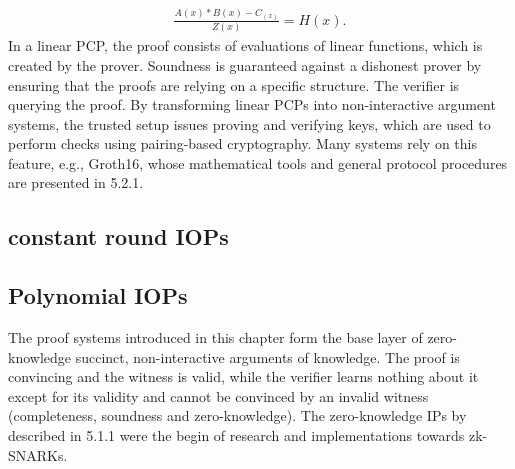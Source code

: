 \begin{align}
    \frac{A(x) * B(x) - C_(x)}{Z(x)} = H(x).
\end{align}
In a linear PCP, the proof consists of evaluations of linear functions, which is created by the prover. Soundness is guaranteed against a dishonest prover by ensuring that the proofs are relying on a specific structure. The verifier is querying the proof. By transforming linear PCPs into non-interactive argument systems, the trusted setup issues proving and verifying keys, which are used to perform checks using pairing-based cryptography. Many systems rely on this feature, e.g., Groth16, whose mathematical tools and general protocol procedures are presented in 5.2.1.

\subsection{constant round IOPs}
\subsection{Polynomial IOPs}

The proof systems introduced in this chapter form the base layer of zero-knowledge succinct, non-interactive arguments of knowledge. The proof is convincing and the witness is valid, while the verifier learns nothing about it except for its validity and cannot be convinced by an invalid witness (completeness, soundness and zero-knowledge). The zero-knowledge IPs by \citet{GoldwasserIPs} described in 5.1.1 were the begin of research and implementations towards zk-SNARKs.

